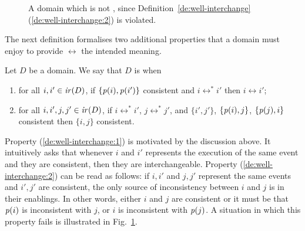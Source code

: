 \begin{figure}
\begin{center}
  \end{center}
  
\caption{A domain which is not {\wi}, since Definition~\ref{de:well-interchange}(\ref{de:well-interchange:2}) is violated.}
\label{fi:not-trans-cons-bis}
\end{figure}


The next definition formalises two additional properties that a domain must enjoy to provide $\leftrightarrow$ the intended meaning.

\begin{definition}[{\wi} domain]
  \label{de:well-interchange}
  Let $D$ be a domain.
  We say that $D$ is \emph{\wi} when
  \begin{enumerate}
  \item
    \label{de:well-interchange:1}
    for all $i,i' \in \mathop{\mathit{ir}({D})}$, if $\{\mathit{p}({i}), \mathit{p}({i'})\}$ consistent
    and $i \leftrightarrow^* i'$ then $i \leftrightarrow i'$;

  \item
    \label{de:well-interchange:2} for all $i,i',j, j' \in \mathop{\mathit{ir}({D})}$, if
    $i \leftrightarrow^* i'$, $j \leftrightarrow^* j'$,  and $\{i', j'\}$,
    $\{\mathit{p}({i}), j\}$,
    $\{\mathit{p}({j}), i\}$ consistent then $\{i, j\}$ consistent.
  \end{enumerate}
\end{definition}

Property (\ref{de:well-interchange:1}) is motivated by the discussion above. It intuitively asks that whenever $i$ and $i'$ represents the execution of the same event and they are consistent, then they are interchangeable. Property (\ref{de:well-interchange:2}) can
be read as follows: if $i, i'$ and $j, j'$ represent the same events
and $i', j'$ are consistent, the only source of inconsistency
between $i$ and $j$ is in their enablings. In other words, either $i$ and $j$ are consistent or it must be that $\mathit{p}({i})$ is inconsistent with $j$, or $i$ is inconsistent with $\mathit{p}({j})$.  A situation in which this property fails is illustrated in Fig.~\ref{fi:not-trans-cons-bis}.

